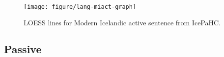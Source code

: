 \begin{knitrout}
\color{fgcolor}\begin{figure}[p!]


{\centering \texttt{[image: figure/lang-miact-graph]} 

}

\caption[LOESS lines for Modern Icelandic active sentence from IcePaHC]{LOESS lines for Modern Icelandic active sentence from IcePaHC.\label{fig:modscanactgraph}\label{fig:miact-graph}}
\end{figure}


\end{knitrout}

\subsection{Passive}
